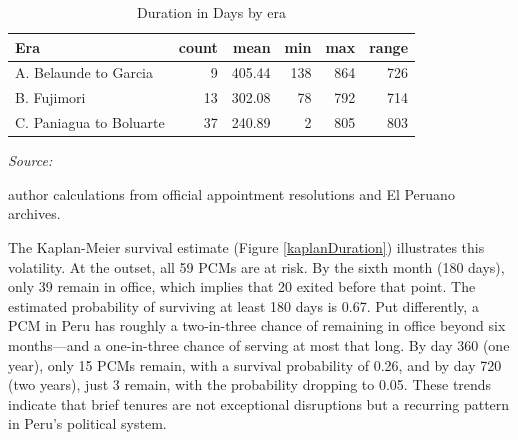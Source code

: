 \documentclass[a4paper, 12pt]{article}
\begin{document}
\begin{table}[!h]
\centering
\caption{Duration in Days by era\label{tab:durationPerEra}}
\centering
\begin{threeparttable}
\begin{tabular}[t]{lrrrrr}
\toprule
Era & count & mean & min & max & range\\
\midrule
A. Belaunde to Garcia & 9 & 405.44 & 138 & 864 & 726\\
B. Fujimori & 13 & 302.08 & 78 & 792 & 714\\
C. Paniagua to Boluarte & 37 & 240.89 & 2 & 805 & 803\\
\bottomrule
\end{tabular}
\begin{tablenotes}[para]
\item \textit{Source: } 
\item author calculations from official appointment resolutions and El Peruano archives.
\end{tablenotes}
\end{threeparttable}
\end{table}

The Kaplan-Meier survival estimate (Figure \ref{kaplanDuration}) illustrates this volatility. At the outset, all 59 PCMs are at risk. By the sixth month (180 days), only 39 remain in office, which implies that 20 exited before that point. The estimated probability of surviving at least 180 days is 0.67. Put differently, a PCM in Peru has roughly a two-in-three chance of remaining in office beyond six months—and a one-in-three chance of serving at most that long. By day 360 (one year), only 15 PCMs remain, with a survival probability of 0.26, and by day 720 (two years), just 3 remain, with the probability dropping to 0.05. These trends indicate that brief tenures are not exceptional disruptions but a recurring pattern in Peru’s political system.
\end{document}

